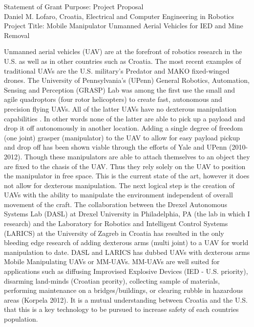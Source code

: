 \documentclass[12pt]{article}
\begin{document}
\begin{center}
Statement of Grant Purpose: Project Proposal\\
Daniel M. Lofaro, Croatia, Electrical and Computer Engineering in Robotics\\
Project Title: Mobile Manipulator Unmanned Aerial Vehicles for IED and Mine Removal\\

\end{center}

Unmanned aerial vehicles (UAV) are at the forefront of robotics research in the U.S. as well as in other countries such as Croatia.  
The most recent examples of traditional UAVs are the U.S. military's Predator and MAKO fixed-winged drones.  
The University of Pennsylvania's (UPenn) General Robotics, Automation, Sensing and Perception (GRASP) Lab was among the first use the small and agile quadroptors (four rotor helicopters) to create fast, autonomous and precision flying UAVs.  
All of the latter UAVs have no dexterous manipulation capabilities .
In other words none of the latter are able to pick up a payload and drop it off autonomously in another location.
Adding a single degree of freedom (one joint) grasper (manipulator) to the UAV to allow for easy payload pickup and drop off has been shown viable through the efforts of Yale and UPenn (2010-2012). 
Though these manipulators are able to attach themselves to an object they are fixed to the chasis of the UAV.
Thus they rely solely on the UAV to position the manipulator in free space.  
This is the current state of the art, however it does not allow for dexterous manipulation.  
The next logical step is the creation of UAVs with the ability to manipulate the environment independent of overall movement of the craft.  
The collaboration between the Drexel Autonomous Systems Lab (DASL) at Drexel University in Philadelphia, PA (the lab in which I research) and the Laboratory for Robotics and Intelligent Control Systems (LARICS) at the University of Zagreb in Croatia has resulted in the only bleeding edge research of adding dexterous arms (multi joint) to a UAV for world manipulation to date.  DASL and LARICS has dubbed UAVs with dexterous arms Mobile Manipulating UAVs or MM-UAVs. 
MM-UAVs are well suited for applications such as diffusing Improvised Explosive Devices (IED - U.S. priority), disarming land-minds (Croatian prority), collecting sample of materials, performing maintenance on a bridges/buildings, or clearing rubble in hazardous areas (Korpela 2012).  
It is a mutual understanding between Croatia and the U.S. that this is a key technology to be pursued to increase safety of each countries population.
\end{document}
